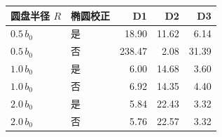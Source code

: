 \begin{tabular}{llrrr}
\toprule
圆盘半径 $R$ & 椭圆校正 & D1 & D2 & D3 \\
\midrule
$0.5\,b_0$ & 是 & 18.90 & 11.62 & 6.14 \\
$0.5\,b_0$ & 否 & 238.47 & 2.08 & 31.39 \\
$1.0\,b_0$ & 是 & 6.00 & 14.68 & 3.60 \\
$1.0\,b_0$ & 否 & 6.92 & 14.35 & 4.40 \\
$2.0\,b_0$ & 是 & 5.84 & 22.43 & 3.32 \\
$2.0\,b_0$ & 否 & 5.76 & 22.57 & 3.32 \\
\bottomrule
\end{tabular}